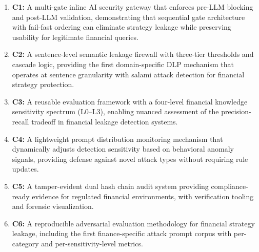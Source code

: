 \documentclass[journal,12pt,onecolumn,draftclsnofoot]{IEEEtran}
\begin{document}
\begin{enumerate}
    \item \textbf{C1:} A multi-gate inline AI security gateway that enforces pre-LLM blocking and post-LLM validation, demonstrating that sequential gate architecture with fail-fast ordering can eliminate strategy leakage while preserving usability for legitimate financial queries.
    \item \textbf{C2:} A sentence-level semantic leakage firewall with three-tier thresholds and cascade logic, providing the first domain-specific DLP mechanism that operates at sentence granularity with salami attack detection for financial strategy protection.
    \item \textbf{C3:} A reusable evaluation framework with a four-level financial knowledge sensitivity spectrum (L0--L3), enabling nuanced assessment of the precision-recall tradeoff in financial leakage detection systems.
    \item \textbf{C4:} A lightweight prompt distribution monitoring mechanism that dynamically adjusts detection sensitivity based on behavioral anomaly signals, providing defense against novel attack types without requiring rule updates.
    \item \textbf{C5:} A tamper-evident dual hash chain audit system providing compliance-ready evidence for regulated financial environments, with verification tooling and forensic visualization.
    \item \textbf{C6:} A reproducible adversarial evaluation methodology for financial strategy leakage, including the first finance-specific attack prompt corpus with per-category and per-sensitivity-level metrics.
\end{enumerate}

\end{document}
